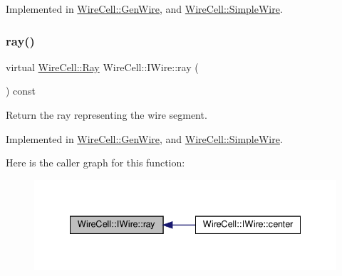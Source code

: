 Implemented in \hyperlink{class_wire_cell_1_1_gen_wire_a3c2544d86575773427983718795ad6b5}{Wire\+Cell\+::\+Gen\+Wire}, and \hyperlink{class_wire_cell_1_1_simple_wire_a73c7459a542146db971644530f8f8d0d}{Wire\+Cell\+::\+Simple\+Wire}.

\mbox{\label{class_wire_cell_1_1_i_wire_aded43e813ce82b02e7fc0316d11cfa43}} 
\subsubsection{\texorpdfstring{ray()}{ray()}}
{\footnotesize\ttfamily virtual \hyperlink{namespace_wire_cell_a3ab20d9b438feb7eb1ffaab9ba98af0c}{Wire\+Cell\+::\+Ray} Wire\+Cell\+::\+I\+Wire\+::ray (\begin{DoxyParamCaption}{ }\end{DoxyParamCaption}) const\hspace{0.3cm}{\ttfamily [pure virtual]}}



Return the ray representing the wire segment. 



Implemented in \hyperlink{class_wire_cell_1_1_gen_wire_a8938590c1c476c57de50ff087f67b8f0}{Wire\+Cell\+::\+Gen\+Wire}, and \hyperlink{class_wire_cell_1_1_simple_wire_a428dfadc5733bf94b4a422762e55b7f7}{Wire\+Cell\+::\+Simple\+Wire}.

Here is the caller graph for this function\+:
\nopagebreak
\begin{figure}[H]
\begin{center}
\leavevmode
\includegraphics[width=335pt]{class_wire_cell_1_1_i_wire_aded43e813ce82b02e7fc0316d11cfa43_icgraph}
\end{center}
\end{figure}
\mbox{\label{class_wire_cell_1_1_i_wire_a8628e5620e63e66790635b59ed8076ce}} 
